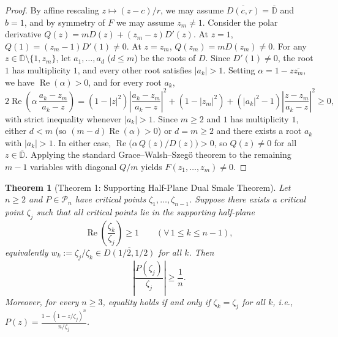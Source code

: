 \documentclass[11pt,a4paper]{article}
\newtheorem{theorem}{Theorem}[section]
\theoremstyle{definition}
\theoremstyle{remark}
\newcommand{\DD}{\mathbb{D}}
\DeclareMathOperator{\RePart}{Re}
\begin{document}
\begin{proof}
By affine rescaling $z \mapsto (z - c)/r$, we may assume $\overline{D(c, r)} = \overline{\DD}$ and $b = 1$, and by symmetry of $F$ we may assume $z_m \neq 1$. Consider the polar derivative $Q(z) = m D(z) + (z_m - z) D'(z)$.
At $z = 1$, $Q(1) = (z_m - 1) D'(1) \neq 0$. At $z = z_m$, $Q(z_m) = m D(z_m) \neq 0$.
For any $z \in \overline{\DD} \setminus \{1, z_m\}$, let $a_1, \dots, a_d$ ($d \le m$) be the roots of $D$. Since $D'(1) \neq 0$, the root $1$ has multiplicity $1$, and every other root satisfies $|a_k| > 1$. Setting $\alpha = 1 - z \overline{z_m}$, we have $\RePart(\alpha) > 0$, and for every root $a_k$,
\[
2 \RePart\!\left(\alpha\,\frac{a_k - z_m}{a_k - z}\right) = (1 - |z|^2)\left|\frac{a_k - z_m}{a_k - z}\right|^2 + (1 - |z_m|^2) + (|a_k|^2 - 1)\left|\frac{z - z_m}{a_k - z}\right|^2 \ge 0,
\]
with strict inequality whenever $|a_k| > 1$. Since $m \ge 2$ and $1$ has multiplicity $1$, either $d < m$ (so $(m - d)\RePart(\alpha) > 0$) or $d = m \ge 2$ and there exists a root $a_k$ with $|a_k| > 1$. In either case, $\RePart\bigl(\alpha\, Q(z) / D(z)\bigr) > 0$, so $Q(z) \neq 0$ for all $z \in \overline{\DD}$. Applying the standard Grace--Walsh--Szeg\"o theorem to the remaining $m - 1$ variables with diagonal $Q/m$ yields $F(z_1, \dots, z_m) \neq 0$.
\end{proof}

\begin{theorem}[Theorem 1: Supporting Half-Plane Dual Smale Theorem]
\label{thm:half-plane}
Let $n \ge 2$ and $P \in \mathcal{P}_n$ have critical points $\zeta_1, \dots, \zeta_{n-1}$. Suppose there exists a critical point $\zeta_j$ such that all critical points lie in the supporting half-plane
\[
\RePart\!\left(\frac{\zeta_k}{\zeta_j}\right) \ge 1 \qquad (\forall\, 1 \le k \le n - 1),
\]
equivalently $w_k := \zeta_j/\zeta_k \in \overline{D(1/2, 1/2)}$ for all $k$. Then
\[
\left|\frac{P(\zeta_j)}{\zeta_j}\right| \ge \frac{1}{n}.
\]
Moreover, for every $n \ge 3$, equality holds if and only if $\zeta_k = \zeta_j$ for all $k$, i.e., $P(z) = \frac{1 - (1 - z/\zeta_j)^n}{n/\zeta_j}$.
\end{theorem}
\end{document}

